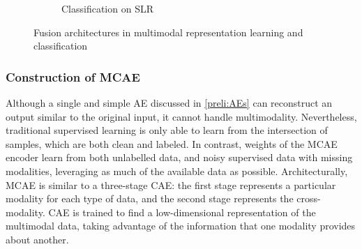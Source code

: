 \begin{figure}
\begin{subfigure}{0.48\linewidth}
		\caption{Classification on SLR}
        \label{fig:slr_11}
	\end{subfigure}
	\caption{Fusion architectures in multimodal representation learning and classification} 
	\label{fig:mm_rL_example1}
\end{figure}

\subsubsection{Construction of MCAE}
Although a single and simple AE discussed in \cref{preli:AEs} can reconstruct an output similar to the original input, it cannot handle multimodality. Nevertheless, traditional supervised learning is only able to learn from the intersection of samples, which are both clean and labeled. In contrast, weights of the MCAE encoder learn from both unlabelled data, and noisy supervised data with missing modalities, leveraging as much of the available data as possible. Architecturally, MCAE is similar to a three-stage CAE: the first stage represents a particular modality for each type of data, and the second stage represents the cross-modality. CAE is trained to find a low-dimensional representation of the multimodal data, taking advantage of the information that one modality provides about another. 

